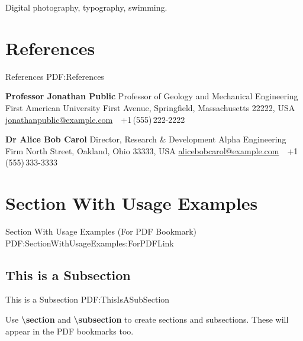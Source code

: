 \documentclass[letterpaper,MMMyyyy,nonstop]{simpleresumecv}
\newcommand{\CodeCommand}[1]{\mbox{\textbf{\textbackslash{#1}}}}
\begin{document}
\begin{body}
Digital photography,
typography,
swimming.


\section
{References}
{References}
{PDF:References}

\BulletItem
\textbf{Professor Jonathan Public}
\newline
Professor of Geology and Mechanical Engineering
\newline
First American University
 First Avenue, Springfield, Massachusetts 22222, USA
\newline
\href{mailto:jonathanpublic@example.com}
{jonathanpublic@example.com}
\,\SubBulletSymbol\,
+1\,(555)\,222-2222

\BigGap
\BulletItem
\textbf{Dr Alice Bob Carol}
\newline
Director, Research \& Development
\newline
Alpha Engineering Firm
 North Street, Oakland, Ohio 33333, USA
\newline
\href{mailto:alicebobcarol@example.com}
{alicebobcarol@example.com}
\,\SubBulletSymbol\,
+1\,(555)\,333-3333


\section
{Section\newline
With\newline
Usage\newline
Examples}
{Section With Usage Examples (For PDF Bookmark)}
{PDF:SectionWithUsageExamples:ForPDFLink}

\subsection
{This is a Subsection}
{This is a Subsection}
{PDF:ThisIsASubSection}

\GapNoBreak
\BulletItem
Use \CodeCommand{section} and \CodeCommand{subsection} to create sections and subsections.
These will appear in the PDF bookmarks too.


\end{body}
\end{document}
